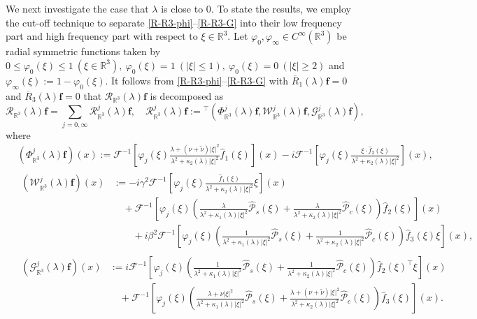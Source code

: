 \documentclass[dvipdfmx,12pt]{article}
\begin{document}
We next investigate the case that $\lambda$ is close to $0$.
To state the results, we employ the cut-off technique to separate \eqref{R-R3-phi}--\eqref{R-R3-G} into their low frequency part and high frequency part with respect to $\xi\in\mathbb{R}^3$. Let $\varphi_0,\varphi_\infty\in C^\infty(\mathbb{R}^3)$ be radial symmetric functions taken by $0\le \varphi_0(\xi)\le 1~(\xi\in\mathbb{R}^3),~\varphi_0(\xi)=
1~( |\xi|\le 1), ~
\varphi_0(\xi)=0~(|\xi|\ge2)$ 
and
$
\varphi_\infty(\xi):=1-\varphi_0(\xi).
$
It follows from \eqref{R-R3-phi}--\eqref{R-R3-G} with $\overline{R}_1(\lambda)\mathbf{f}=0$ and $\overline{R}_3(\lambda)\mathbf{f}=0$ that $\mathcal{R}_{\mathbb{R}^3}(\lambda)\mathbf{f}$ is decomposed as 
\[
\mathcal{R}_{\mathbb{R}^3}(\lambda)\mathbf{f}=\sum_{j=0,\infty}\mathcal{R}_{\mathbb{R}^3}^j(\lambda)\mathbf{f}, \quad \mathcal{R}_{\mathbb{R}^3}^j(\lambda)\mathbf{f}:={}^\top(\Phi_{\mathbb{R}^3}^j(\lambda)\mathbf{f},\mathcal{W}_{\mathbb{R}^3}^j(\lambda)\mathbf{f},\mathcal{G}_{\mathbb{R}^3}^j(\lambda)\mathbf{f}),
\]
where
\begin{align}
&\label{R-R3-phi-j}
(\Phi_{\mathbb{R}^3}^j(\lambda)\mathbf{f})(x):=\mathcal{F}^{-1}\left[\varphi_j(\xi)\frac{\lambda+(\nu+\tilde{\nu})|\xi|^2}{\lambda^2+\kappa_2(\lambda)|\xi|^2}\widehat{f}_1(\xi)\right](x) -i\mathcal{F}^{-1}\left[\varphi_j(\xi)\frac{\xi\cdot\widehat{f}_2(\xi)}{\lambda^2+\kappa_2(\lambda)|\xi|^2}\right](x),
\\
&\label{R-R3-w-j}
\begin{aligned}
(\mathcal{W}_{\mathbb{R}^3}^j(\lambda)\mathbf{f})(x) 
&:=-i\gamma^2\mathcal{F}^{-1}\left[\varphi_j(\xi)\frac{\widehat{f}_1(\xi)}{\lambda^2+\kappa_2(\lambda)|\xi|^2}\xi\right](x) \\
&\quad+\mathcal{F}^{-1}\left[\varphi_j(\xi)\left(\frac{\lambda}{\lambda^2+\kappa_1(\lambda)|\xi|^2}\widehat{\mathcal{P}}_s(\xi)+\frac{\lambda}{\lambda^2+\kappa_2(\lambda)|\xi|^2}\widehat{\mathcal{P}}_c(\xi)\right)\widehat{f}_2(\xi)\right](x)\\
&\qquad +i\beta^2\mathcal{F}^{-1}\left[\varphi_j(\xi)\left(\frac{1}{\lambda^2+\kappa_1(\lambda)|\xi|^2}\widehat{\mathcal{P}}_s(\xi)+\frac{1}{\lambda^2+\kappa_2(\lambda)|\xi|^2}\widehat{\mathcal{P}}_c(\xi)\right)\widehat{f}_3(\xi)\xi\right](x),
\end{aligned}
\\
&\label{R-R3-G-j}
\begin{aligned}
(\mathcal{G}_{\mathbb{R}^3}^j(\lambda)\mathbf{f})(x)
&:=i\mathcal{F}^{-1}\left[\varphi_j(\xi)\left(\frac{1}{\lambda^2+\kappa_1(\lambda)|\xi|^2}\widehat{\mathcal{P}}_s(\xi)+\frac{1}{\lambda^2+\kappa_2(\lambda)|\xi|^2}\widehat{\mathcal{P}}_c(\xi)\right)\widehat{f}_2(\xi)^\top\xi\right](x)\\
&\quad +\mathcal{F}^{-1}\left[\varphi_j(\xi)\left(\frac{\lambda+\nu|\xi|^2}{\lambda^2+\kappa_1(\lambda)|\xi|^2}\widehat{\mathcal{P}}_s(\xi)+\frac{\lambda+(\nu+\tilde{\nu})|\xi|^2}{\lambda^2+\kappa_2(\lambda)|\xi|^2}\widehat{\mathcal{P}}_c(\xi)\right)\widehat{f}_3(\xi)\right](x).
\end{aligned}
\end{align}
\end{document}
